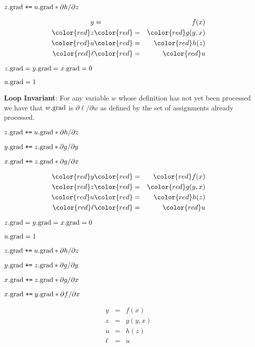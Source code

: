 {\medskip
$z.\mathrm{grad}\;\mbox{\tt +=}\; u.\mathrm{grad} * {\partial h}/{\partial z}$

\vspace{-3ex}
\begin{eqnarray*}
  y & = & f(x) \\
  {\color{red} z} & {\color{red} =} & {\color{red} g(y,x)} \\
  {\color{red} u} & {\color{red} =} & {\color{red} h(z)} \\
  {\color{red} \ell} & {\color{red} =} & {\color{red}  u}
\end{eqnarray*}

\medskip
$z.\mathrm{grad} = y.\mathrm{grad} = x.\mathrm{grad} = 0$

\medskip
$u.\mathrm{grad} = 1$

\medskip
    {\bf Loop Invariant}: For any variable $w$ whose definition has not yet been processed we have that $w.\mathrm{grad}$ is $\partial \ell/\partial w$ as defined by the set of assignments already processed.

\medskip
$z.\mathrm{grad}\;\mbox{\tt +=}\; u.\mathrm{grad} * {\partial h}/{\partial z}$

\medskip
$y.\mathrm{grad} \;\mbox{\tt +=}\; z.\mathrm{grad} * {\partial g}/{\partial y}$

\medskip
$x.\mathrm{grad} \;\mbox{\tt +=}\; z.\mathrm{grad} * {\partial g}/{\partial x}$

\vspace{-3ex}
\begin{eqnarray*}
  {\color{red} y} & {\color{red} =} & {\color{red} f(x)} \\
  {\color{red} z} & {\color{red} =} & {\color{red} g(y,x)} \\
  {\color{red} u} & {\color{red} =} & {\color{red} h(z)} \\
  {\color{red} \ell} & {\color{red} =} & {\color{red} u}
\end{eqnarray*}

\medskip
$z.\mathrm{grad} = y.\mathrm{grad} = x.\mathrm{grad} = 0$

\medskip
$u.\mathrm{grad} = 1$

\medskip
$z.\mathrm{grad}\;\mbox{\tt +=}\; u.\mathrm{grad} * {\partial h}/{\partial z}$

\medskip
$y.\mathrm{grad} \;\mbox{\tt +=}\; z.\mathrm{grad} * {\partial g}/{\partial y}$

\medskip
$x.\mathrm{grad} \;\mbox{\tt +=}\; z.\mathrm{grad} * {\partial g}/{\partial x}$

\medskip
$x.\mathrm{grad} \;\mbox{\tt +=}\; y.\mathrm{grad} * {\partial f}/{\partial x}$

\vspace{-3ex}
\begin{eqnarray*}
  y & = & f(x) \\
  z & = & g(y,x) \\
  u & = & h(z) \\
  \ell & = & u
\end{eqnarray*}

}

